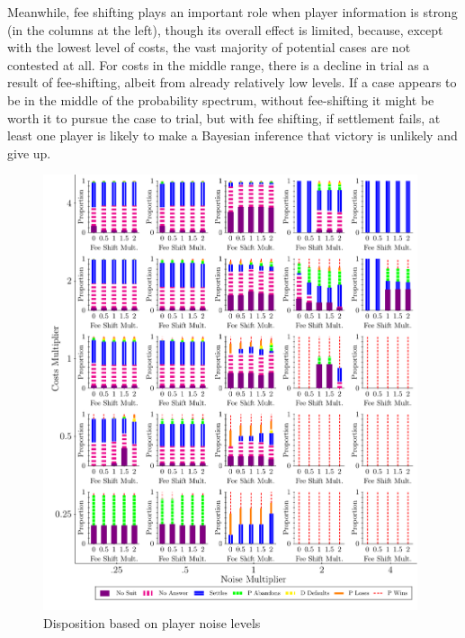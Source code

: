 \documentclass{article}
\begin{document}
Meanwhile, fee shifting plays an important role when player information is strong (in the columns at the left), though its overall effect is limited, because, except with the lowest level of costs, the vast majority of potential cases are not contested at all. For costs in the middle range, there is a decline in trial as a result of fee-shifting, albeit from already relatively low levels. If a case appears to be in the middle of the probability spectrum, without fee-shifting it might be worth it to pursue the case to trial, but with fee shifting, if settlement fails, at least one player is likely to make a Bayesian inference that victory is unlikely and give up. 

\begin{figure}
    \centering
    \begin{minipage}{0.48\textwidth}
        \centering
        \includegraphics[width=0.98\textwidth, scale=0.70, trim={0in 0in 0in 0in}, clip]{../Figures/Disposition Varying Noise Multiplier} %
        \caption{Disposition based on player noise levels}
		\label{fig:dispositions_playernoise}
    \end{minipage}\hfill
    \begin{minipage}{0.48\textwidth}

\end{minipage}
\end{figure}
\end{document}
